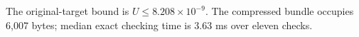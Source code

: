 The original-target bound is $U\le 8.208\times10^{-9}$. The compressed bundle occupies 6,007 bytes; median exact checking time is 3.63 ms over eleven checks. 
